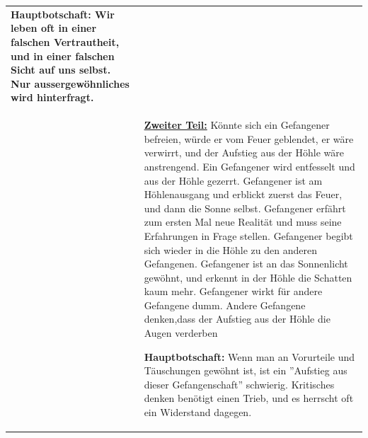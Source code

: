 \begin{longtable}{>{\bfseries}p{}p{}}
						 \textbf{Hauptbotschaft:} Wir leben oft in einer falschen Vertrautheit, und in einer falschen Sicht auf uns selbst. Nur aussergewöhnliches wird hinterfragt.
						\\
					& \textbf{\underline{Zweiter Teil:}} \newline
						Könnte sich ein Gefangener befreien, würde er vom Feuer geblendet, er wäre verwirrt, und der Aufstieg aus der Höhle wäre anstrengend.\newline
						Ein Gefangener wird entfesselt und aus der Höhle gezerrt.\newline
						Gefangener ist am Höhlenausgang und erblickt zuerst das Feuer, und dann die Sonne selbst.\newline
						Gefangener erfährt zum ersten Mal neue Realität und muss seine Erfahrungen in Frage stellen.\newline 
						Gefangener begibt sich wieder in die Höhle zu den anderen Gefangenen.\newline
						Gefangener ist an das Sonnenlicht gewöhnt, und erkennt in der Höhle die Schatten kaum mehr.\newline
						Gefangener wirkt für andere Gefangene dumm.\newline
						Andere Gefangene denken,dass der Aufstieg aus der Höhle die Augen verderben\newline
						
						 \textbf{Hauptbotschaft:} Wenn man an Vorurteile und Täuschungen gewöhnt ist, ist ein ''Aufstieg aus dieser Gefangenschaft'' schwierig. Kritisches denken benötigt einen Trieb, und es herrscht oft ein Widerstand dagegen.
						\\
				\hline
			\end{longtable}
			
			
